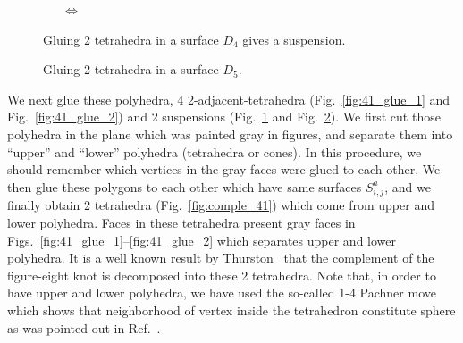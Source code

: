 \documentclass[12pt]{article}
\numberwithin{equation}{section}
\begin{document}
\begin{figure}[htbp]
  \begin{center}
    \parbox{8.5cm}{
      \begin{psfrags}
      \end{psfrags}
      }
    ~~~$\Longleftrightarrow$~~~
    \parbox{4cm}{
      \begin{psfrags}
      \end{psfrags}
      }
    \caption{Gluing 2 tetrahedra in a surface $D_4$ gives a suspension.}
    \label{fig:41_glue_sp}
  \end{center}
\end{figure}


\begin{figure}[htbp]
  \begin{center}
    \begin{psfrags}
    \end{psfrags}
    \caption{Gluing 2 tetrahedra  in a surface $D_5$.}
    \label{fig:41_glue_sp_2}
  \end{center}
\end{figure}

We next glue these polyhedra,
4 2-adjacent-tetrahedra (Fig.~\ref{fig:41_glue_1}
and Fig.~\ref{fig:41_glue_2}) and 2 suspensions
(Fig.~\ref{fig:41_glue_sp} and Fig.~\ref{fig:41_glue_sp_2}).
We first cut those polyhedra in the plane which was painted  gray in
figures, and separate them into ``upper'' and ``lower'' polyhedra
(tetrahedra or cones).
In this procedure, we should remember  which vertices
in the gray faces
were  glued to each other.
We then glue these polygons to each other
which have  same surfaces $S^a_{i,j}$,
and we finally obtain 2 tetrahedra
(Fig.~\ref{fig:comple_41}) which come from   upper and lower polyhedra.
Faces in these tetrahedra present  gray faces
in Figs.~\ref{fig:41_glue_1}--\ref{fig:41_glue_2} which separates
upper and lower polyhedra.
It is a well known result by Thurston~\cite{WPThurs80Lecture} that the
complement of
the figure-eight knot is decomposed into these 2 tetrahedra.
Note that,  in order to have upper and lower polyhedra, we have used the so-called
1-4 Pachner move which shows that
neighborhood of  vertex inside the tetrahedron  constitute sphere
as was pointed out in Ref.~.
\end{document}
